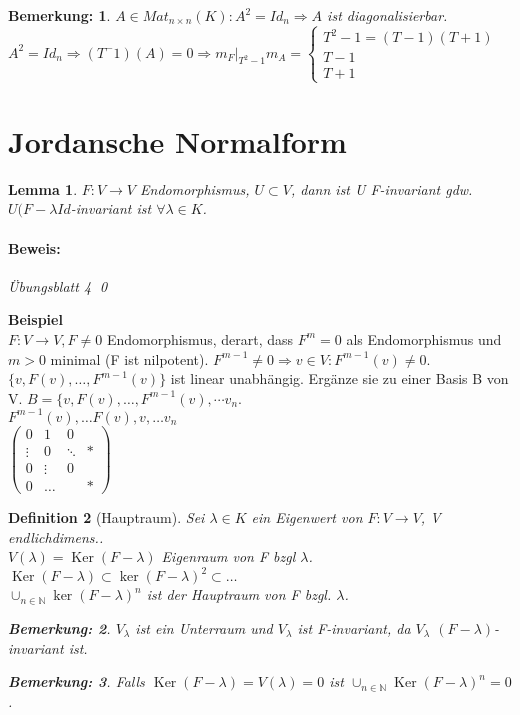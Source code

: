 \documentclass{report}
\newcommand{\lb}{\lambda}
\newcommand{\N}{\mathbb{N}}
\DeclareMathOperator{\Ker}{Ker}
\theoremstyle{customrem}
\newtheorem*{bemerkung}{Bemerkung\textnormal:}
\theoremstyle{customdef}
\newtheorem{definition}{Definition}[chapter]
\newtheorem{lemma}[definition]{Lemma}
\renewenvironment{proof}{\paragraph{Beweis: }}{\qed}
\theoremstyle{customenv}
\begin{document}
\begin{bemerkung}
  \(A \in Mat_{n \times n}(K) : A^2 = Id_n \Rightarrow A\) ist diagonalisierbar.\\
  \(A^2 = Id_n \Rightarrow (T^ - 1)(A) = 0 \Rightarrow m_F|_{T^2 - 1}
  m_A = \begin{cases}T^2 - 1 = (T - 1)(T + 1) \\ T - 1 \\ T + 1\end{cases}
  \)
\end{bemerkung}

\section*{Jordansche Normalform}

\begin{lemma}
  \(F : V \to V\) Endomorphismus, \(U \subset V\), dann ist U F-invariant gdw.
  \(U (F - \lb Id\)-invariant ist \(\forall \lb \in K\).
  \begin{proof}
    \"Ubungsblatt 4
  \end{proof}
\end{lemma}

\textbf{Beispiel}\\
\(F : V \to V, F \neq 0\) Endomorphismus, derart, dass \(F^m = 0\) als
Endomorphismus und \(m > 0\) minimal (F ist nilpotent). \(F^{m-1} \neq 0
\Rightarrow v \in V : F^{m-1}(v) \neq 0\). \(\{v, F(v), \dots, F^{m-1}(v)\}\)
ist linear unabh\"angig. Erg\"anze sie zu einer Basis B von V.
\(B = \{v, F(v), \dots, F^{m-1}(v), \dotsm v_n\).\\
\(F^{m-1}(v), \dots F(v), v, \dots v_n\)\\
\(
  \begin{pmatrix}
    0      & 1      & 0      & \\
    \vdots & 0      & \ddots & *\\
    0      & \vdots & 0      & \\
    0      & \dots  &        & *
  \end{pmatrix}
\)

\begin{definition}[Hauptraum]
  Sei \(\lb \in K\) ein Eigenwert von \(F : V \to V\), V endlichdimens..\\
  \(V(\lb) = \Ker(F - \lb)\) Eigenraum von F bzgl \(\lb\).\\
  \(\Ker(F - \lb) \subset \ker(F - \lb)^2 \subset \dots\)\\
  \(\cup_{n \in \N} \ker(F - \lb)^n\) ist der Hauptraum von F bzgl. \(\lb\).
  \begin{bemerkung}
    \(V_\lb\) ist ein Unterraum und \(V_\lb\) ist F-invariant,
    da \(V_\lb\) \((F - \lb)\)-invariant ist.
  \end{bemerkung}
  \begin{bemerkung}
    Falls \(\Ker(F - \lb) = V(\lb) = 0\) ist
    \(\cup_{n \in \N}\Ker(F - \lb)^n = 0\).
  \end{bemerkung}
\end{definition}
\end{document}
